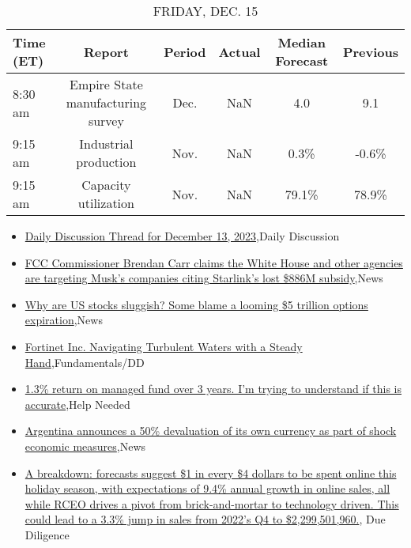 \documentclass{article}%
\begin{document}
%


\begin{table}[htbp]%
\caption{FRIDAY, DEC. 15}%
\centering%
\begin{adjustbox}{width=1\textwidth}%
\begin{tabular}{lccccc}
\toprule
Time (ET) &                            Report & Period & Actual & Median Forecast & Previous \\
\midrule
  8:30 am & Empire State manufacturing survey &   Dec. &    NaN &             4.0 &      9.1 \\
  9:15 am &             Industrial production &   Nov. &    NaN &            0.3\% &    -0.6\% \\
  9:15 am &              Capacity utilization &   Nov. &    NaN &           79.1\% &    78.9\% \\
\bottomrule
\end{tabular}
%
\end{adjustbox}%
\end{table}

%
\begin{itemize}%
\item%
\href{https://reddit.com/r/wallstreetbets/comments/18hecm1/daily\_discussion\_thread\_for\_december\_13\_2023/}{Daily Discussion Thread for December 13, 2023},Daily Discussion%
\item%
\href{https://reddit.com/r/wallstreetbets/comments/18he37a/fcc\_commissioner\_brendan\_carr\_claims\_the\_white/}{FCC Commissioner Brendan Carr claims the White House and other agencies are targeting Musk's companies citing Starlink's lost \$886M subsidy},News%
\item%
\href{https://reddit.com/r/wallstreetbets/comments/18h9f3n/why\_are\_us\_stocks\_sluggish\_some\_blame\_a\_looming\_5/}{Why are US stocks sluggish? Some blame a looming \$5 trillion options expiration},News%
\item%
\href{https://reddit.com/r/StockMarket/comments/18hd4k6/fortinet\_inc\_navigating\_turbulent\_waters\_with\_a/}{Fortinet Inc.  Navigating Turbulent Waters with a Steady Hand},Fundamentals/DD%
\item%
\href{https://reddit.com/r/StockMarket/comments/18gqua9/13\_return\_on\_managed\_fund\_over\_3\_years\_im\_trying/}{1.3\% return on managed fund over 3 years. I'm trying to understand if this is accurate},Help Needed%
\item%
\href{https://reddit.com/r/Economics/comments/18h2ugo/argentina\_announces\_a\_50\_devaluation\_of\_its\_own/}{Argentina announces a 50\% devaluation of its own currency as part of shock economic measures},News%
\item%
\href{https://reddit.com/r/Superstonk/comments/18h94mb/a\_breakdown\_forecasts\_suggest\_1\_in\_every\_4/}{A breakdown: forecasts suggest \$1 in every \$4 dollars to be spent online this holiday season, with expectations of 9.4\% annual growth in online sales, all while RCEO drives a pivot from brick-and-mortar to technology driven. This could lead to a 3.3\% jump in sales from 2022's Q4 to \$2,299,501,960.}, Due Diligence%
\end{itemize}%
\end{document}

